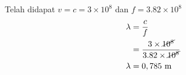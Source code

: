 Telah didapat $v=c=3\times 10^8$ dan $f=3.82\times 10^8$
\begin{align*}
    \lambda &= \frac{c}{f}\\
    &=\frac{3\times \cancel{10^8}}{3.82\times \cancel{10^8}}\\
    \lambda&=0,785\ \si{m}
\end{align*}